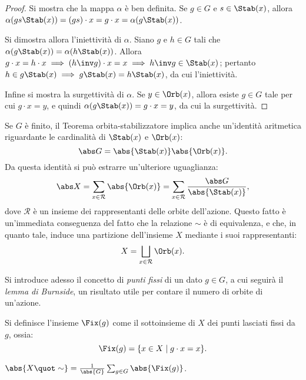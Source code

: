 \documentclass[12pt]{scrartcl}
\begin{document}
	\begin{proof}
		Si mostra che la mappa $\alpha$ è ben definita. Se $g \in G$ e $s \in \Stab(x)$,
		allora $\alpha(gs \Stab(x)) = (gs) \cdot x = g \cdot x = \alpha(g \Stab(x))$. \medskip


		Si dimostra allora l'iniettività di $\alpha$. Siano $g$ e $h \in G$ tali
		che $\alpha(g \Stab(x)) = \alpha(h \Stab(x))$. Allora $g \cdot x = h \cdot x \implies
		(h\inv g) \cdot x = x \implies h \inv g \in \Stab(x)$; pertanto $h \in g \Stab(x) \implies g \Stab(x) = h \Stab(x)$, da cui l'iniettività. \medskip
		
		
		Infine si mostra la surgettività di $\alpha$. Se $y \in \Orb(x)$, allora esiste
		$g \in G$ tale per cui $g \cdot x = y$, e quindi $\alpha(g \Stab(x)) = g \cdot x = y$,
		da cui la surgettività.
	\end{proof} \bigskip
	

	Se $G$ è finito, il Teorema orbita-stabilizzatore implica anche un'identità aritmetica
	riguardante le cardinalità di $\Stab(x)$ e $\Orb(x)$:
	\[ \abs G = \abs{\Stab(x)} \abs{\Orb(x)}. \]
	Da questa identità si può estrarre un'ulteriore uguaglianza:
	\[ \abs X = \sum_{x \in \mathcal{R}} \abs{\Orb(x)} =  \sum_{x \in \mathcal{R}} \frac{\abs G}{\abs{\Stab(x)}}, \]
	dove $\mathcal{R}$ è un insieme dei rappresentanti delle orbite dell'azione. Questo
	fatto è un'immediata conseguenza del fatto che la relazione $\sim$ è di equivalenza,
	e che, in quanto tale, induce una partizione dell'insieme $X$ mediante i suoi
	rappresentanti:
	\[ X = \bigsqcup_{x \in \mathcal{R}} \Orb(x). \] \bigskip


	Si introduce adesso il concetto di \textit{punti fissi} di un dato $g \in G$, a cui
	seguirà il \textit{lemma di Burnside}, un risultato utile per contare il numero
	di orbite di un'azione.
	
	\begin{definition}
		Si definisce l'insieme $\Fix(g)$ come il sottoinsieme di $X$ dei punti
		lasciati fissi da $g$, ossia:
		\[ \Fix(g) = \{ x \in X \mid g \cdot x = x \}. \]
	\end{definition}
	
	\begin{proposition}
		$\abs{X \quot \sim} = \frac{1}{\abs{G}} \sum_{g \in G} \abs{\Fix(g)}$.
	\end{proposition}
	
\end{document}
